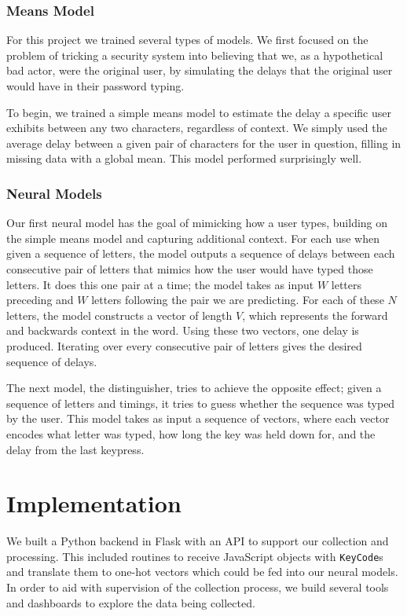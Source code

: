 \documentclass{amsart}
\begin{document}
\begin{multicols*}{2}
\subsubsection{Means Model}
For this project we trained several types of models. We first focused on the problem of tricking a security system into believing that we, as a hypothetical bad actor, were the original user, by simulating the delays that the original user would have in their password typing.

To begin, we trained a simple means model to estimate the delay a specific user exhibits between any two characters, regardless of context. We simply used the average delay between a given pair of characters for the user in question, filling in missing data with a global mean. This model performed surprisingly well.

\subsubsection{Neural Models}
Our first neural model has the goal of mimicking how a user types, building on the simple means model and capturing additional context. For each use when given a sequence of letters, the model outputs a sequence of delays between each consecutive pair of letters that mimics how the user would have typed those letters. It does this one pair at a time; the model takes as input $W$ letters preceding and $W$ letters following the pair we are predicting. For each of these $N$ letters, the model constructs a vector of length $V$, which represents the forward and backwards context in the word. Using these two vectors, one delay is produced. Iterating over every consecutive pair of letters gives the desired sequence of delays.

The next model, the distinguisher, tries to achieve the opposite effect; given a sequence of letters and timings, it tries to guess whether the sequence was typed by the user. This model takes as input a sequence of vectors, where each vector encodes what letter was typed, how long the key was held down for, and the delay from the last keypress.

\section{Implementation}

We built a Python backend in Flask with an API to support our collection and processing. This included routines to receive JavaScript objects with \texttt{KeyCode}s and translate them to one-hot vectors which could be fed into our neural models. In order to aid with supervision of the collection process, we build several tools and dashboards to explore the data being collected.


\end{multicols*}
\end{document}
